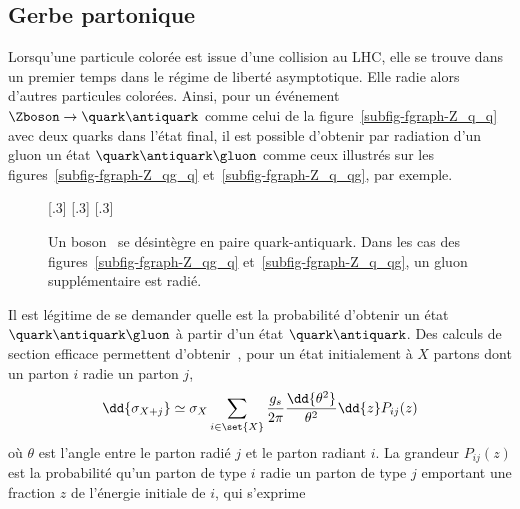 \subsection{Gerbe partonique}\label{chapter-JERC-section-jets-subsec-gerbe-partonique}
Lorsqu'une particule colorée est issue d'une collision au LHC, elle se trouve dans un premier temps dans le régime de liberté asymptotique. Elle radie alors d'autres particules colorées. Ainsi, pour un événement $\Zboson\to\quark\antiquark$ comme celui de la figure~\ref{subfig-fgraph-Z_q_q} avec deux quarks dans l'état final, il est possible d'obtenir par radiation d'un gluon un état $\quark\antiquark\gluon$ comme ceux illustrés sur les figures~\ref{subfig-fgraph-Z_qg_q} et~\ref{subfig-fgraph-Z_q_qg}, par exemple.
\begin{figure}[h]
\centering\vspace{\baselineskip}
\subcaptionbox{\label{subfig-fgraph-Z_q_q}}[.3\textwidth]
{\vspace{\baselineskip}}
\hfill
\subcaptionbox{\label{subfig-fgraph-Z_qg_q}}[.3\textwidth]
{\vspace{\baselineskip}}
\hfill
\subcaptionbox{\label{subfig-fgraph-Z_q_qg}}[.3\textwidth]
{\vspace{\baselineskip}}
\caption{Un boson \Zboson\ se désintègre en paire quark-antiquark. Dans les cas des figures~\ref{subfig-fgraph-Z_qg_q} et~\ref{subfig-fgraph-Z_q_qg}, un gluon supplémentaire est radié.}
\label{fig-fgraph-Z_q_q_xg}
\end{figure}
\par Il est légitime de se demander quelle est la probabilité d'obtenir un état $\quark\antiquark\gluon$ à partir d'un état $\quark\antiquark$.
Des calculs de section efficace permettent d'obtenir~\cite{salam2010elements}, pour un état initialement à $X$ partons dont un parton $i$ radie un parton $j$,
\begin{equation}
\dd{\sigma_{X+j}} \simeq \sigma_{X} \sum_{i\in\set{X}} \frac{g_s}{2\pi} \frac{\dd{\theta^2}}{\theta^2} \dd{z} P_{ij}(z)
\end{equation}
où $\theta$ est l'angle entre le parton radié $j$ et le parton radiant $i$. La grandeur $P_{ij}(z)$ est la probabilité qu'un parton de type $i$ radie un parton de type $j$ emportant une fraction $z$ de l'énergie initiale de $i$, qui s'exprime
